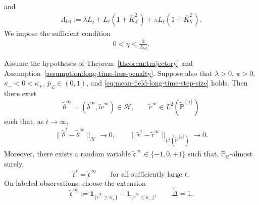 and
\begin{align}
    \Lambda_{\mathrm{bd}}
    :=
    \lambda L_j+L_\ell(1+\bar K_{\mathcal L}^2)
    +\pi L_\ell(1+\bar K_{\mathcal U}^2).
    \label{eq:lambda-bd}
\end{align}
We impose the sufficient condition
\begin{align}
    0<\eta<\frac2{\Lambda_{\mathrm{bd}}}.
    \label{eq:mean-field-long-time-step-size}
\end{align}

\begin{theorem}
\label{thm:effective-process-convergence}
Assume the hypotheses of Theorem~\ref{theorem:trajectory}
and Assumption~\ref{assumption:long-time-loss-penalty}.
Suppose also that $\lambda>0$, $\pi>0$,
$\kappa_-<0<\kappa_+$, $\bar p_{\mathcal L}\in(0,1)$,
and \eqref{eq:mean-field-long-time-step-size} holds.
Then there exist
\[
    \tilde\theta^\infty
    =
    (\bar b^\infty,\tilde w^\infty)
    \in\mathcal H,
    \qquad
    \tilde r^\infty
    \in L^2(\tilde{\mathbb P}^{[g]})
\]
such that, as $t\to\infty$,
\begin{align}
    \|\tilde\theta^t-\tilde\theta^\infty\|_{\mathcal H}
    \longrightarrow0,
    \qquad
    \|\tilde r^t-\tilde r^\infty\|_
        {L^2(\tilde{\mathbb P}^{[g]})}
    \longrightarrow0.
    \label{eq:effective-score-convergence}
\end{align}
Moreover, there exists a random variable
$\tilde{\mathfrak c}^{\,\infty}\in\{-1,0,+1\}$ such that,
$\tilde{\mathbb P}_{\mathcal U}$-almost surely,
\[
    \tilde{\mathfrak c}^{\,t}
    =
    \tilde{\mathfrak c}^{\,\infty}
    \qquad\text{for all sufficiently large }t,
\]
On labeled observations, choose the extension
\[
    \tilde{\mathfrak c}^{\,\infty}
    :=
    \mathbf1_{\{\tilde r^\infty\geq\kappa_+\}}
    -
    \mathbf1_{\{\tilde r^\infty\leq\kappa_-\}},
    \qquad \tilde\Delta=1.
\]
\end{theorem}

